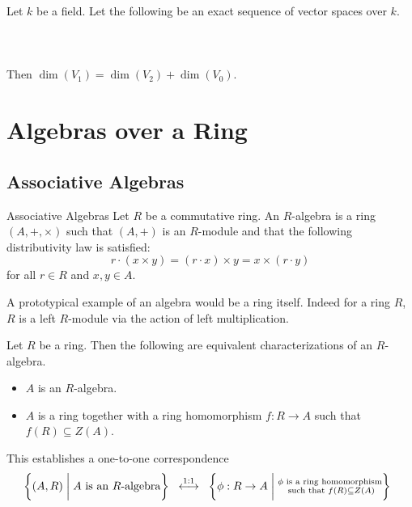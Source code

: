 \documentclass[a4paper]{article}
\begin{document}
\begin{lmm}{}{} Let $k$ be a field. Let the following be an exact sequence of vector spaces over $k$. \\~\\
\\~\\
Then $\dim(V_1)=\dim(V_2)+\dim(V_0)$. 
\end{lmm}

\pagebreak
\section{Algebras over a Ring}
\subsection{Associative Algebras}
\begin{defn}{Associative Algebras}{} Let $R$ be a commutative ring. An $R$-algebra is a ring $(A,+,\times)$ such that $(A,+)$ is an $R$-module and that the following distributivity law is satisfied: $$r\cdot(x\times y)=(r\cdot x)\times y=x\times(r\cdot y)$$ for all $r\in R$ and $x,y\in A$. 
\end{defn}

A prototypical example of an algebra would be a ring itself. Indeed for a ring $R$, $R$ is a left $R$-module via the action of left multiplication. 

\begin{prp}{}{} Let $R$ be a ring. Then the following are equivalent characterizations of an $R$-algebra. 
\begin{itemize}
\item $A$ is an $R$-algebra. 
\item $A$ is a ring together with a ring homomorphism $f:R\to A$ such that $f(R)\subseteq Z(A)$. 
\end{itemize}
\end{prp}

This establishes a one-to-one correspondence $$\left\{(A,R)\;\bigg{|}\;A\text{ is an }R\text{-algebra}\right\}\;\;\overset{1:1}{\longleftrightarrow}\;\;\left\{\phi:R\to A\;\bigg{|}\;\substack{\phi\text{ is a ring homomorphism}\\\text{ such that }f(R)\subseteq Z(A)}\right\}\;\;$$
\end{document}
